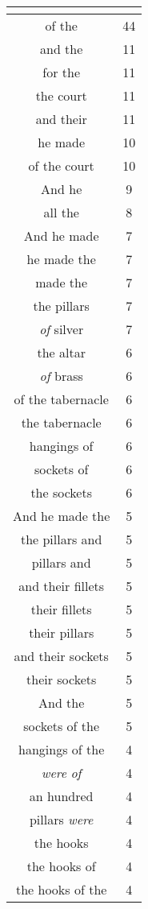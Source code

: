 \begin{center}
\begin{longtable}{|c|c|}
\hline \multicolumn{2}{c}{{ }} \\ \hline
\endfoot 
of the & 44\\ \hline 
and the & 11\\ \hline 
for the & 11\\ \hline 
the court & 11\\ \hline 
and their & 11\\ \hline 
he made & 10\\ \hline 
of the court & 10\\ \hline 
And he & 9\\ \hline 
all the & 8\\ \hline 
And he made & 7\\ \hline 
he made the & 7\\ \hline 
made the & 7\\ \hline 
the pillars & 7\\ \hline 
\emph{of} silver & 7\\ \hline 
the altar & 6\\ \hline 
\emph{of} brass & 6\\ \hline 
of the tabernacle & 6\\ \hline 
the tabernacle & 6\\ \hline 
hangings of & 6\\ \hline 
sockets of & 6\\ \hline 
the sockets & 6\\ \hline 
And he made the & 5\\ \hline 
the pillars and & 5\\ \hline 
pillars and & 5\\ \hline 
and their fillets & 5\\ \hline 
their fillets & 5\\ \hline 
their pillars & 5\\ \hline 
and their sockets & 5\\ \hline 
their sockets & 5\\ \hline 
And the & 5\\ \hline 
sockets of the & 5\\ \hline 
hangings of the & 4\\ \hline 
\emph{were} \emph{of} & 4\\ \hline 
an hundred & 4\\ \hline 
pillars \emph{were} & 4\\ \hline 
the hooks & 4\\ \hline 
the hooks of & 4\\ \hline 
the hooks of the & 4\\ \hline 

\end{longtable}
\end{center}
